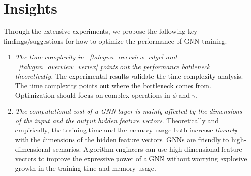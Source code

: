 \section{Insights}

Through the extensive experiments, we propose the following key findings/suggestions for how to optimize the performance of GNN training.

\begin{enumerate}
    \item \emph{The time complexity in \tablename~\ref{tab:gnn_overview_edge} and \tablename~\ref{tab:gnn_overview_vertex} points out the performance bottleneck theoretically.}
          The experimental results validate the time complexity analysis.
          The time complexity points out where the bottleneck comes from.
          Optimization should focus on complex operations in $\phi$ and $\gamma$.

    \item \emph{The computational cost of a GNN layer is mainly affected by the dimensions of the input and the output hidden feature vectors.}
          Theoretically and empirically, the training time and the memory usage both increase \emph{linearly} with the dimensions of the hidden feature vectors.
          GNNs are friendly to high-dimensional scenarios.
          Algorithm engineers can use high-dimensional feature vectors to improve the expressive power of a GNN without worrying explosive growth in the training time and memory usage.


\end{enumerate}

